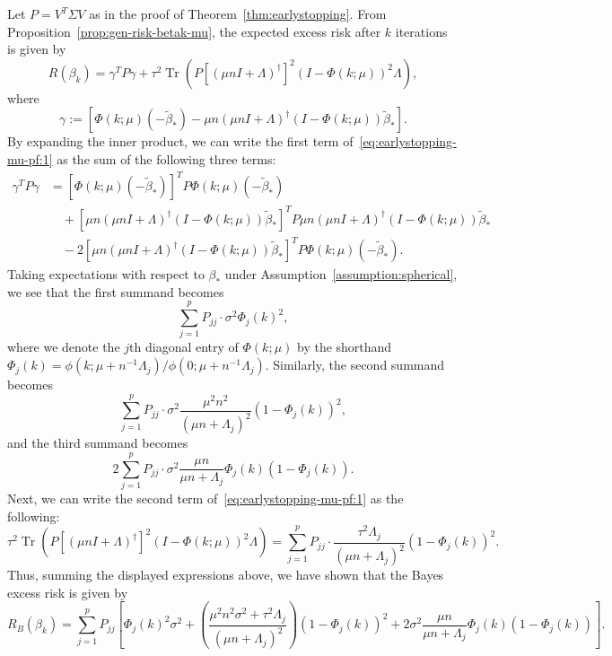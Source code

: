 \documentclass[11pt]{article}
\DeclareMathOperator{\Tr}{Tr}
\newenvironment{proof*}
  {\par\pushQED{\qed}\normalfont\ignorespaces}
  {\popQED\par}
\begin{document}
\begin{proof*}
Let $P = V^T \Sigma V$ as in the proof of Theorem~\ref{thm:earlystopping}. From Proposition~\ref{prop:gen-risk-betak-mu}, the expected excess risk after $k$ iterations is given by
\begin{equation} \label{eq:earlystopping-mu-pf:1}
    R(\beta_k) = \gamma^T P \gamma + \tau^2 \Tr\left( P \left[(\mu n I + \Lambda)^\dagger\right]^2 (I - \Phi(k; \mu))^2 \Lambda\right),
\end{equation}
where 
\[
    \gamma := \left[ \Phi(k; \mu)(- \tilde{\beta}_*) - \mu n (\mu n I + \Lambda)^\dagger (I - \Phi(k; \mu)) \tilde{\beta}_* \right].
\]
By expanding the inner product, we can write the first term of~\eqref{eq:earlystopping-mu-pf:1} as the sum of the following three terms:
\begin{align*}
    \gamma^T P \gamma
    &= \left[\Phi(k; \mu)(- \tilde{\beta}_*)\right]^T P \Phi(k; \mu)(- \tilde{\beta}_*) \\
    &\quad + \left[\mu n (\mu n I + \Lambda)^\dagger (I - \Phi(k; \mu)) \tilde{\beta}_*\right]^T P \mu n (\mu n I + \Lambda)^\dagger (I - \Phi(k; \mu)) \tilde{\beta}_* \\
    &\quad -2\left[\mu n (\mu n I + \Lambda)^\dagger (I - \Phi(k; \mu)) \tilde{\beta}_*\right]^T P\Phi(k; \mu)( - \tilde{\beta}_*).
\end{align*}
Taking expectations with respect to $\beta_*$ under Assumption~\ref{assumption:spherical}, we see that the first summand becomes
\[
    \sum_{j=1}^{p} P_{jj} \cdot \sigma^2 \Phi_j(k)^2,
\]
where we denote the $j$th diagonal entry of $\Phi(k;\mu)$ by the shorthand $\Phi_j(k) = \phi(k;\mu + n^{-1} \Lambda_j) / \phi(0;\mu + n^{-1} \Lambda_j)$.
Similarly, the second summand becomes
\[
     \sum_{j=1}^{p} P_{jj}\cdot \sigma^2 \frac{\mu^2 n^2}{(\mu n + \Lambda_j)^2} (1 - \Phi_j(k))^2,
\]
and the third summand becomes
\[
    2 \sum_{j=1}^{p} P_{jj} \cdot \sigma^2 \frac{\mu n}{\mu n + \Lambda_j}\Phi_j(k) (1-\Phi_j(k)).
\]
Next, we can write the second term of~\eqref{eq:earlystopping-mu-pf:1} as the following:
\[
    \tau^2 \Tr\left( P \left[(\mu n I + \Lambda)^\dagger\right]^2 (I - \Phi(k; \mu))^2 \Lambda\right) = \sum_{j=1}^{p} P_{jj} \cdot \frac{\tau^2 \Lambda_j}{(\mu n + \Lambda_j)^2}(1-\Phi_j(k))^2.
\]
Thus, summing the displayed expressions above, we have shown that the Bayes excess risk is given by
\[
    R_B(\beta_k) =  \sum_{j=1}^{p} P_{jj} \left[\Phi_j(k)^2 \sigma^2 + \left(\frac{\mu^2 n^2 \sigma^2 + \tau^2 \Lambda_j}{(\mu n + \Lambda_j)^2}\right)(1 - \Phi_j(k))^2 + 2 \sigma^2 \frac{\mu n}{\mu n + \Lambda_j} \Phi_j(k) (1 - \Phi_j(k)) \right].
\]
\end{proof*}
\end{document}
